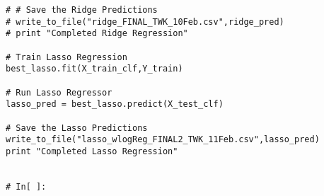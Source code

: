 \documentclass[11pt, oneside]{article}   	%
\begin{document}
\begin{lstlisting}
# # Save the Ridge Predictions
# write_to_file("ridge_FINAL_TWK_10Feb.csv",ridge_pred)
# print "Completed Ridge Regression"

# Train Lasso Regression
best_lasso.fit(X_train_clf,Y_train)

# Run Lasso Regressor
lasso_pred = best_lasso.predict(X_test_clf)

# Save the Lasso Predictions
write_to_file("lasso_wlogReg_FINAL2_TWK_11Feb.csv",lasso_pred)
print "Completed Lasso Regression"


# In[ ]:





\end{lstlisting}
 
\end{document}
